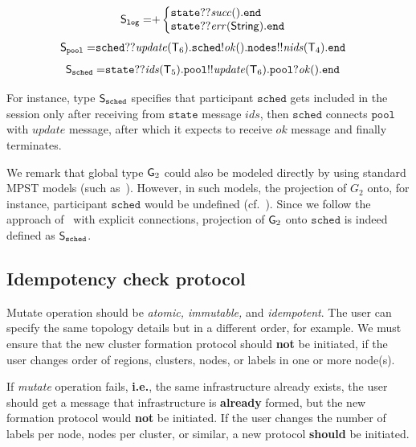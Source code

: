 \begin{align*}
	\ST_\mathtt{log} =& 
	{+}
	\left\{
	\begin{array}{@{}l@{}}
	\mathtt{state}{??}\mathit{succ}().\tend\\
	\mathtt{state}{??}\mathit{err}(\mathsf{String}).\tend
	\end{array} \right.
\end{align*}
\begin{align*}
	{\mathsf S}_\mathtt{pool} =&
	\mathtt{sched}{??}\mathit{update}({\mathsf T}_6).
	\mathtt{sched}{!}\mathit{ok}(). 
	\mathtt{nodes}{!!}\mathit{nids}({\mathsf T}_4).\mathtt{end}
\end{align*}
\begin{align*}
	{\mathsf S}_\mathtt{sched} =& 
	\mathtt{state}{??}\mathit{ids}({\mathsf T}_5).
	\mathtt{pool}{!!}\mathit{update}({\mathsf T}_6).
	\mathtt{pool}{?}\mathit{ok}().\mathtt{end}
\end{align*}

\noindent
For instance, type ${\mathsf S}_\mathtt{sched}$ specifies that participant $\mathtt{sched}$ gets included in the session only after receiving from $\mathtt{state}$ message $\mathit{ids}$, then $\mathtt{sched}$ connects $\mathtt{pool}$ with $\mathit{update}$ message, after which it expects to receive $\mathit{ok}$ message and finally terminates. 

We remark that global type ${\sf G}_2$ could also be modeled directly by using standard MPST models (such as~\cite{HondaYC08}). However, in such models, the projection of $G_2$ onto, for instance, participant $\mathtt{sched}$ would be undefined (cf.~\cite{HuY17}).
Since we follow the approach of~\cite{HuY17} with explicit connections, projection of ${\sf G}_2$ onto $\mathtt{sched}$ is indeed defined as ${\mathsf S}_\mathtt{sched}$.
%
%
\subsection{Idempotency check protocol}\label{sec:idempotency_protocol}
%
Mutate operation should be \emph{atomic, immutable,} and \emph{idempotent}. The user can specify the same topology details but in a different order, for example. We must ensure that the new cluster formation protocol should \textbf{not} be initiated, if the user changes order of regions, clusters, nodes, or labels in one or more node(s). 

If \emph{mutate} operation fails, \textbf{i.e.}, the same infrastructure already exists, the user should get a message that infrastructure is \textbf{already} formed, but the new formation protocol would \textbf{not} be initiated. If the user changes the number of labels per node, nodes per cluster, or similar, a new protocol \textbf{should} be initiated.

